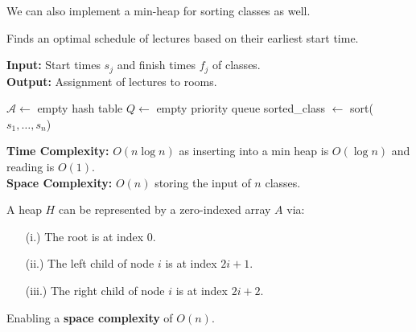 \noindent
We can also implement a min-heap for sorting classes as well. 
\newpage
\begin{Func}[EarliestStartTimeFirst Algorithm - \texttt{EST($j = 1 \dots n : s_j, f_j$)}]
    Finds an optimal schedule of lectures based on their earliest start time.

    \vspace{.5em}
    \noindent
    \textbf{Input:} Start times $s_j$ and finish times $f_j$ of classes.\\
    \textbf{Output:} Assignment of lectures to rooms.\\
    \begin{algorithm}[H]
        \SetAlgoLined
        $\mathcal{A} \gets$ empty hash table 
        $Q \gets$ empty priority queue 
        sorted\_class $\gets$ sort($s_1, \dots, s_n$) 
        
    \end{algorithm}

    \noindent
    \textbf{Time Complexity:} $O(n\log n)$ as inserting into a min heap is $O(\log n)$ and reading is $O(1)$.\\
    \textbf{Space Complexity:} $O(n)$ storing the input of $n$ classes.
\end{Func}

\begin{theo}

    A heap $H$ can be represented by a zero-indexed array $A$ via:
    \begin{itemize}
        \item[(i.)] The root is at index $0$.
        \item[(ii.)] The left child of node $i$ is at index $2i + 1$.
        \item[(iii.)] The right child of node $i$ is at index $2i + 2$.
    \end{itemize}

    \noindent
    Enabling a \textbf{space complexity} of $O(n)$.
\end{theo}
\newpage


